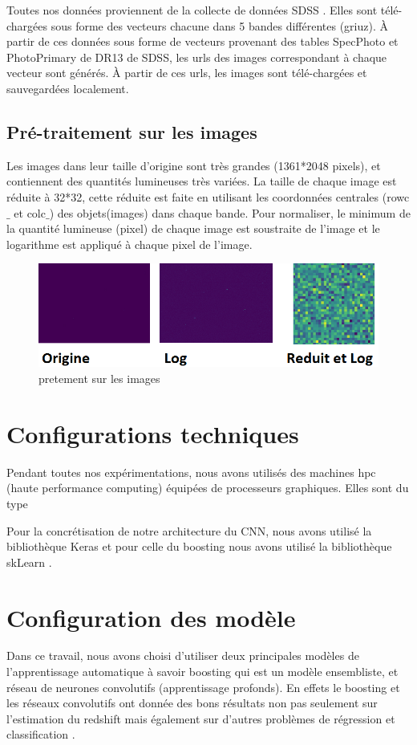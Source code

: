Toutes nos données proviennent de la collecte de données SDSS . Elles sont télé-chargées sous forme des vecteurs chacune dans 5 bandes différentes (griuz). À partir de ces données sous forme de vecteurs provenant des tables SpecPhoto et PhotoPrimary de DR13 de SDSS, les urls des images correspondant à chaque vecteur sont générés. À partir de ces urls, les images sont télé-chargées et sauvegardées localement. 

\subsection{Pré-traitement sur les images}
Les images dans leur taille d'origine sont très grandes (1361*2048 pixels), et contiennent des quantités lumineuses très variées.
La taille de chaque image est réduite à 32*32, cette réduite est faite en utilisant les coordonnées centrales (rowc$\_$ et colc$\_$) des objets(images) dans chaque bande. Pour normaliser, le minimum de la quantité lumineuse (pixel) de chaque image est soustraite de l'image et le logarithme est appliqué à chaque pixel de l'image.  


\begin{figure}[H]
    \centering
    \includegraphics[scale = 0.5]{images/pretaitemen.png}
    \caption{pretement sur les images}
\end{figure}

\section{Configurations techniques}
Pendant toutes nos expérimentations, nous avons utilisés des machines hpc (haute performance computing) équipées de processeurs graphiques. Elles sont du type 

Pour la concrétisation de notre architecture du CNN, nous avons utilisé la bibliothèque Keras \cite{chollet2015keras}  et pour celle du boosting nous avons utilisé la bibliothèque skLearn \cite{scikit-learn}.
\section{Configuration des modèle}
Dans ce travail, nous avons choisi d'utiliser deux principales modèles de l'apprentissage automatique à savoir boosting qui est un modèle ensembliste, et réseau de neurones convolutifs (apprentissage profonds). En effets le boosting et les réseaux convolutifs ont donnée des bons résultats non pas seulement sur l'estimation du redshift \cite{meuphirim, isanto} mais également sur d'autres problèmes de régression et classification \cite{boost, adavencedCNN}. \\

